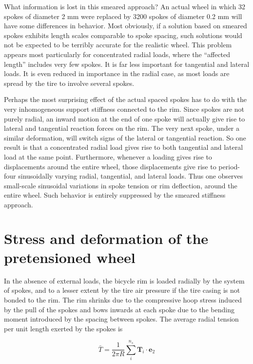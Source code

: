 \documentclass[../thesis.tex]{subfiles}
\newcommand{\et}{\mathbf{e}_2}
\begin{document}
What information is lost in this smeared approach? An actual wheel in which 32 spokes of diameter 2 mm were replaced by 3200 spokes of diameter 0.2 mm will have some differences in behavior.
Most obviously, if a solution based on smeared spokes exhibits length scales comparable to spoke spacing, such solutions would not be expected to be terribly accurate for the realistic wheel. This problem appears most particularly for concentrated radial loads, where the ``affected length'' includes very few spokes. It is far less important for tangential and lateral loads. It is even reduced in importance in the radial case, as most loads are spread by the tire to involve several spokes.

Perhaps the most surprising effect of the actual spaced spokes has to do with the very inhomogeneous support stiffness connected to the rim. Since spokes are not purely radial, an inward motion at the end of one spoke will actually give rise to lateral and tangential reaction forces on the rim. The very next spoke, under a similar deformation, will switch signs of the lateral or tangential reaction. So one result is that a concentrated radial load gives rise to both tangential and lateral load at the same point. Furthermore, whenever a loading gives rise to displacements around the entire wheel, those displacements give rise to period-four sinusoidally varying radial, tangential, and lateral loads. Thus one observes small-scale sinusoidal variations in spoke tension or rim deflection, around the entire wheel. Such behavior is entirely suppressed by the smeared stiffness approach.


\section{Stress and deformation of the pretensioned wheel}

In the absence of external loads, the bicycle rim is loaded radially by the system of spokes, and to a lesser extent by the tire air pressure if the tire casing is not bonded to the rim\cite{Burgoyne}. The rim shrinks due to the compressive hoop stress induced by the pull of the spokes and bows inwards at each spoke due to the bending moment introduced by the spacing between spokes. The average radial tension per unit length exerted by the spokes is

\begin{equation}
\label{eq:Tbar}
\bar{T} = \frac{1}{2\pi R} \sum_i^{n_s} \mathbf{T}_i\cdot\et
\end{equation}
\end{document}
